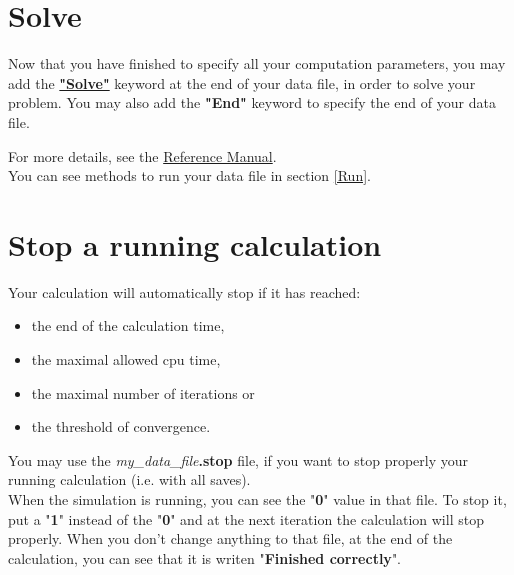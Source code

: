 \section{Solve}
Now that you have finished to specify all your computation parameters, you may add the \href{\REFERENCEMANUAL\#solve}{\textbf{"Solve"}} keyword at the end of your data file, in order to solve your problem.
You may also add the \textbf{"End"} keyword to specify the end of your data file.

    \begin{center}
    \end{center}

For more details, see the \href{\REFERENCEMANUAL\#solve}{\trustref Reference Manual}. \\

You can see methods to run your data file in section \ref{Run}.



\section{Stop a running calculation} \label{stopfile}
Your calculation will automatically stop if it has reached:
\begin{itemize}
\item the end of the calculation time,
\item the maximal allowed cpu time,
\item the maximal number of iterations or
\item the threshold of convergence.
\end{itemize}

You may use the \textit{my\_data\_file}\textbf{.stop} file, if you want to stop properly your running calculation (i.e. with all saves).\\

When the simulation is running, you can see the "\textbf{0}" value in that file.
To stop it, put a "\textbf{1}" instead of the "\textbf{0}" and at the next iteration the calculation will stop properly.
When you don't change anything to that file, at the end of the calculation, you can see that it is writen "\textbf{Finished correctly}".



